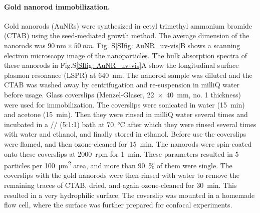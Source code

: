 \paragraph*{Gold nanorod immobilization.}
Gold nanorods (AuNRs) were synthesized in cetyl trimethyl ammonium bromide (CTAB) using the seed-mediated growth method.\cite{nikoobakht2003preparation}
The average dimension of the nanorods was $\SI{90}{\nm} \times \SI{50}{nm}$. Fig. S\ref{SIfig: AuNR_uv-vis}B shows a scanning electron microscopy image of the nanoparticles.
The bulk absorption spectra of these nanorods in Fig.S\ref{SIfig: AuNR_uv-vis}A show the longitudinal surface plasmon resonance (LSPR) 
at \SI{640}{\nm}. The nanorod sample was diluted and the CTAB was washed away by centrifugation and re-suspension in milliQ water before usage.
Glass coverslips (Menzel-Glaser, \SI[product-units=repeat]{22x40}{\mm}, no. 1 thickness) were used for immobilization.
The coverslips were sonicated in water (\SI{15}{\minute}) and acetone (\SI{15}{\minute}).
Then they were rinsed in milliQ water several times and incubated in a // (5:1:1) bath at \SI{70}{\celsius} after which they were rinsed several times with water and ethanol, and finally stored in ethanol.
Before use the coverslips were flamed, and then ozone-cleaned for \SI{15}{\minute}.
The nanorods were spin-coated onto these coverslips at \SI{2000}{rpm} for \SI{1}{\minute}. 
These parameters resulted in 5 particles per \SI{100}{\um\squared} area, and more than \SI{90}{\percent} of them were single. 
The coverslips with the gold nanorods were then rinsed with water to remove the remaining traces of CTAB, dried, and again ozone-cleaned for \SI{30}{\minute}.
This resulted in a very  hydrophilic surface. The coverslip was mounted in a homemade flow cell, where the surface was further prepared for confocal experiments.


